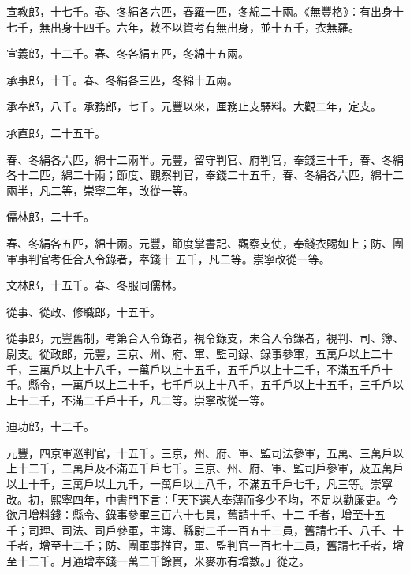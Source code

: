 \begin{pinyinscope}
 宣教郎，十七千。春、冬絹各六匹，春羅一匹，冬綿二十兩。《無豐格》：有出身十七千，無出身十四千。六年，敕不以資考有無出身，並十五千，衣無羅。



 宣義郎，十二千。春、冬各絹五匹，冬綿十五兩。



 承事郎，十千。春、冬絹各三匹，冬綿十五兩。



 承奉郎，八千。承務郎，七千。元豐以來，厘務止支驛料。大觀二年，定支。



 承直郎，二十五千。



 春、冬絹各六匹，綿十二兩半。元豐，留守判官、府判官，奉錢三十千，春、冬絹各十二匹，綿二十兩；節度、觀察判官，奉錢二十五千，春、冬絹各六匹，綿十二兩半，凡二等，崇寧二年，改從一等。



 儒林郎，二十千。



 春、冬絹各五匹，綿十兩。元豐，節度掌書記、觀察支使，奉錢衣賜如上；防、團軍事判官考任合入令錄者，奉錢十
 五千，凡二等。崇寧改從一等。



 文林郎，十五千。春、冬服同儒林。



 從事、從政、修職郎，十五千。



 從事郎，元豐舊制，考第合入令錄者，視令錄支，未合入令錄者，視判、司、簿、尉支。從政郎，元豐，三京、州、府、軍、監司錄、錄事參軍，五萬戶以上二十千，三萬戶以上十八千，一萬戶以上十五千，五千戶以上十二千，不滿五千戶十千。縣令，一萬戶以上二十千，七千戶以上十八千，五千戶以上十五千，三千戶以上十二千，不滿二千戶十千，凡二等。崇寧改從一等。



 迪功郎，十二千。



 元豐，四京軍巡判官，十五千。三京，州、府、軍、監司法參軍，五萬、三萬戶以上十二千，二萬戶及不滿五千戶七千。三京、州、府、軍、監司戶參軍，及五萬戶以上十千，三萬戶以上九千，一萬戶以上八千，不滿五千戶七千，凡三等。崇寧改。初，熙寧四年，中書門下言：「天下選人奉薄而多少不均，不足以勸廉吏。今欲月增料錢：縣令、錄事參軍三百六十七員，舊請十千、十二
 千者，增至十五千；司理、司法、司戶參軍，主簿、縣尉二千一百五十三員，舊請七千、八千、十千者，增至十二千；防、團軍事推官，軍、監判官一百七十二員，舊請七千者，增至十二千。月通增奉錢一萬二千餘貫，米麥亦有增數。」從之。




\end{pinyinscope}
